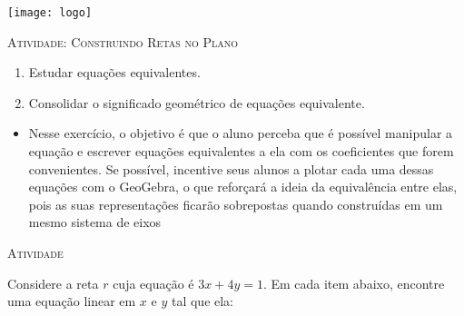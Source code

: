 \documentclass[10 pt,usenames,dvipsnames, oneside]{article}
\begin{document}
\begin{center}
  \begin{minipage}[l]{3cm}
\texttt{[image: logo]}    
\end{minipage}\hfill
\begin{minipage}[r]{.8\textwidth}
 {\Large \scshape Atividade: Construindo Retas no Plano}  
\end{minipage}
\end{center}
\vspace{.2cm}

\ifdefined\prof

\begin{goals}
\begin{enumerate}
\item Estudar equações equivalentes.
\item Consolidar o significado geométrico de equações equivalente. 
\end{enumerate}

\tcblower

\begin{itemize}
\item Nesse exercício, o objetivo é que o aluno perceba que é possível manipular a equação e escrever equações equivalentes a ela com os coeficientes que forem convenientes. Se possível, incentive seus alunos a plotar cada uma dessas equações com o GeoGebra, o que reforçará a ideia da equivalência entre elas, pois as suas representações ficarão sobrepostas quando construídas em um mesmo sistema de eixos
\end{itemize}
\end{goals}

\bigskip
\begin{center}
{\large \scshape Atividade}
\end{center}
\fi

Considere a reta $r$ cuja equação é $3x + 4y = 1$. Em cada item abaixo, encontre uma equação linear em $x$ e $y$ tal que ela:
\end{document}
